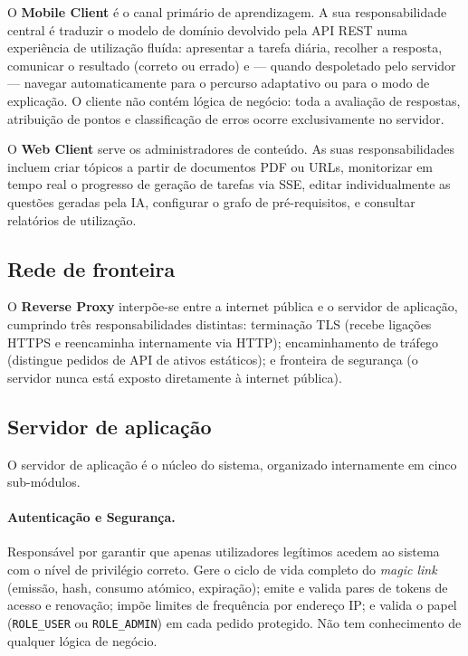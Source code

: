 O \textbf{Mobile Client} \'e o canal prim\'ario de aprendizagem. A sua
responsabilidade central \'e traduzir o modelo de dom\'inio devolvido pela
API REST numa experi\^encia de utiliza\c{c}\~ao flu\'ida: apresentar a tarefa
di\'aria, recolher a resposta, comunicar o resultado (correto ou errado) e ---
quando despoletado pelo servidor --- navegar automaticamente para o percurso
adaptativo ou para o modo de explica\c{c}\~ao. O cliente n\~ao cont\'em
l\'ogica de neg\'ocio: toda a avalia\c{c}\~ao de respostas, atribui\c{c}\~ao
de pontos e classifica\c{c}\~ao de erros ocorre exclusivamente no servidor.

O \textbf{Web Client} serve os administradores de conte\'udo. As suas
responsabilidades incluem criar t\'opicos a partir de documentos PDF ou URLs,
monitorizar em tempo real o progresso de gera\c{c}\~ao de tarefas via SSE,
editar individualmente as quest\~oes geradas pela IA, configurar o grafo de
pr\'e-requisitos, e consultar relat\'orios de utiliza\c{c}\~ao.

\subsection{Rede de fronteira}
\label{ssec:fronteira}

O \textbf{Reverse Proxy} interp\~oe-se entre a internet p\'ublica e o servidor
de aplica\c{c}\~ao, cumprindo tr\^es responsabilidades distintas: termina\c{c}\~ao
TLS (recebe liga\c{c}\~oes HTTPS e reencaminha internamente via HTTP);
encaminhamento de tr\'afego (distingue pedidos de API de ativos est\'aticos);
e fronteira de seguran\c{c}a (o servidor nunca est\'a exposto diretamente
\`a internet p\'ublica).

\subsection{Servidor de aplica\c{c}\~ao}
\label{ssec:servidor}

O servidor de aplica\c{c}\~ao \'e o n\'ucleo do sistema, organizado
internamente em cinco sub-m\'odulos.

\paragraph{Autentica\c{c}\~ao e Seguran\c{c}a.}
Respons\'avel por garantir que apenas utilizadores leg\'itimos acedem ao
sistema com o n\'ivel de privil\'egio correto. Gere o ciclo de vida completo
do \emph{magic link} (emiss\~ao, hash, consumo at\'omico, expira\c{c}\~ao);
emite e valida pares de tokens de acesso e renova\c{c}\~ao; imp\~oe limites
de frequ\^encia por endere\c{c}o IP; e valida o papel
(\texttt{ROLE\_USER} ou \texttt{ROLE\_ADMIN}) em cada pedido protegido.
N\~ao tem conhecimento de qualquer l\'ogica de neg\'ocio.

